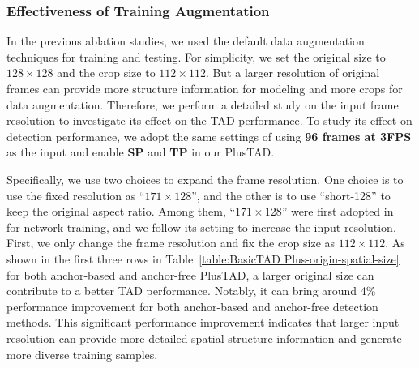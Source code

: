 \documentclass[a4paper,fleqn]{cas-dc}
\begin{document}
\subsubsection{Effectiveness of Training Augmentation}
In the previous ablation studies, we used the default data augmentation techniques for training and testing.
For simplicity, we set the original size to $128\times128$ and the crop size to $112\times112$. 
But a larger resolution of original frames can provide more structure information for modeling and more crops for data augmentation.
Therefore, we perform a detailed study on the input frame resolution to investigate its effect on the TAD performance.
To study its effect on detection performance, we adopt the same settings of using \textbf{96 frames at 3FPS} as the input and enable \textbf{SP} and \textbf{TP} in our PlusTAD.

Specifically, we use two choices to expand the frame resolution. One choice is to use the fixed resolution as  ``$171 \times128$'', and the other is to use ``short-128'' to keep the original aspect ratio. 
Among them, ``$171 \times128$'' were first adopted in~\citep{r-c3d} for network training, and we follow its setting to increase the input resolution.
First, we only change the frame resolution and fix the crop size as $112 \times 112$.
As shown in the first three rows in Table~\ref{table:BasicTAD Plus-origin-spatial-size} for both anchor-based and anchor-free PlusTAD, a larger original size can contribute to a better TAD performance. Notably, it can bring around 4\% performance improvement for both anchor-based and anchor-free detection methods. This significant performance improvement indicates that larger input resolution can provide more detailed spatial structure information and generate more diverse training samples.
\end{document}
